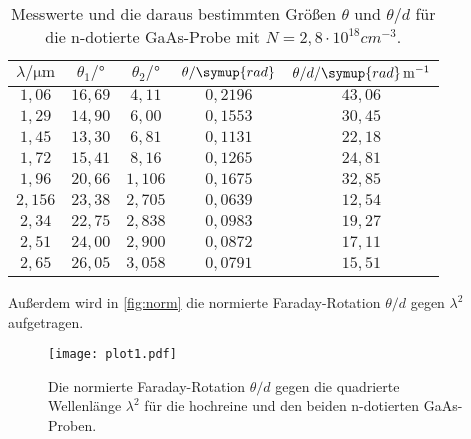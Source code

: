 \begin{table}
  \centering
  \caption{Messwerte und die daraus bestimmten Größen $\theta$ und $\theta/d$ für die n-dotierte GaAs-Probe
  mit $N=2,8 \cdot 10^{18} \si{cm}^{-3}$.}
  \label{tab:m3}
  \begin{tabular}{c c c c c}
    \toprule
    $\lambda/\si{\micro\meter}$ & $\theta_{1}/\si{\degree}$ & $\theta_{2}/\si{\degree}$ & $\theta/\symup{rad}$ & $\theta/d/\symup{rad}\, \si{m}^{-1}$\\
    \midrule
    $1,06 $ & $16,69$ & $4,11$  & $0,2196$ & $43,06$ \\
    $1,29 $ & $14,90$ & $6,00$  & $0,1553$ & $30,45$ \\
    $1,45 $ & $13,30$ & $6,81$  & $0,1131$ & $22,18$ \\
    $1,72 $ & $15,41$ & $8,16$  & $0,1265$ & $24,81$ \\
    $1,96 $ & $20,66$ & $1,106$ & $0,1675$ & $32,85$ \\
    $2,156$ & $23,38$ & $2,705$ & $0,0639$ & $12,54$ \\
    $2,34 $ & $22,75$ & $2,838$ & $0,0983$ & $19,27$ \\
    $2,51 $ & $24,00$ & $2,900$ & $0,0872$ & $17,11$ \\
    $2,65 $ & $26,05$ & $3,058$ & $0,0791$ & $15,51$ \\
    \bottomrule
  \end{tabular}
\end{table}
Außerdem wird in \autoref{fig:norm} die normierte Faraday-Rotation $\theta/d$ gegen $\lambda^2$ aufgetragen.
\begin{figure}
  \label{fig:norm}
  \texttt{[image: plot1.pdf]}
  \caption{Die normierte Faraday-Rotation $\theta/d$ gegen die quadrierte Wellenlänge $\lambda^2$ für die
  hochreine und den beiden n-dotierten GaAs-Proben.}
\end{figure}